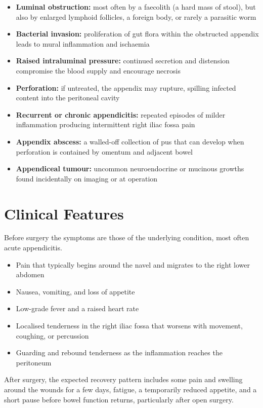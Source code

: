 \begin{itemize}
    \item \textbf{Luminal obstruction:} most often by a faecolith (a hard mass of stool), but also by enlarged lymphoid follicles, a foreign body, or rarely a parasitic worm
    \item \textbf{Bacterial invasion:} proliferation of gut flora within the obstructed appendix leads to mural inflammation and ischaemia
    \item \textbf{Raised intraluminal pressure:} continued secretion and distension compromise the blood supply and encourage necrosis
    \item \textbf{Perforation:} if untreated, the appendix may rupture, spilling infected content into the peritoneal cavity
    \item \textbf{Recurrent or chronic appendicitis:} repeated episodes of milder inflammation producing intermittent right iliac fossa pain
    \item \textbf{Appendix abscess:} a walled-off collection of pus that can develop when perforation is contained by omentum and adjacent bowel
    \item \textbf{Appendiceal tumour:} uncommon neuroendocrine or mucinous growths found incidentally on imaging or at operation
\end{itemize}

\section*{Clinical Features}
Before surgery the symptoms are those of the underlying condition, most often acute appendicitis.

\begin{itemize}
    \item Pain that typically begins around the navel and migrates to the right lower abdomen
    \item Nausea, vomiting, and loss of appetite
    \item Low-grade fever and a raised heart rate
    \item Localised tenderness in the right iliac fossa that worsens with movement, coughing, or percussion
    \item Guarding and rebound tenderness as the inflammation reaches the peritoneum
\end{itemize}

After surgery, the expected recovery pattern includes some pain and swelling around the wounds for a few days, fatigue, a temporarily reduced appetite, and a short pause before bowel function returns, particularly after open surgery.

